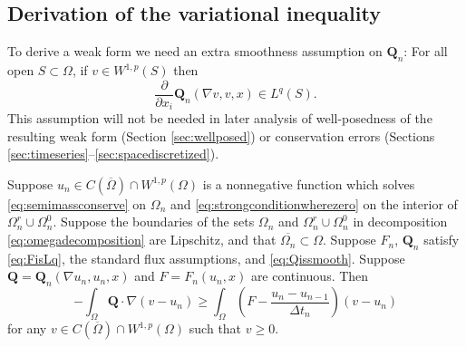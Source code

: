 \documentclass[final,onefignum]{siamart190516}
\newcommand\bQ{\mathbf{Q}}
\newcommand{\grad}{\nabla}
\begin{document}
\subsection{Derivation of the variational inequality}  \label{subsec:derivevi}  To derive a weak form we need an extra smoothness assumption on $\bQ_n$:  For all open $S \subset \Omega$, if $v\in W^{1,p}(S)$ then
\begin{equation}
\frac{\partial}{\partial x_i} \bQ_n(\grad v,v,x) \in L^q(S). \label{eq:Qissmooth}
\end{equation}
This assumption will not be needed in later analysis of well-posedness of the resulting weak form (Section \ref{sec:wellposed}) or conservation errors (Sections \ref{sec:timeseries}--\ref{sec:spacediscretized}).

\begin{theorem} \label{thm:strongimpliesweak}  Suppose $u_n \in C(\overline{\Omega}) \cap W^{1,p}(\Omega)$ is a nonnegative function which solves \eqref{eq:semimassconserve} on $\Omega_n$ and \eqref{eq:strongconditionwherezero} on the interior of $\Omega_n^r \cup \Omega_n^0$.  Suppose the boundaries of the sets $\Omega_n$ and $\Omega_n^r \cup \Omega_n^0$ in decomposition \eqref{eq:omegadecomposition} are Lipschitz, and that $\overline{\Omega_n} \subset \Omega$.  Suppose $F_n$, $\bQ_n$ satisfy \eqref{eq:FisLq}, the standard flux assumptions, and \eqref{eq:Qissmooth}.  Suppose $\bQ = \bQ_n(\grad u_n,u_n,x)$ and $F=F_n(u_n,x)$ are continuous.  Then
\begin{equation}
-\int_{\Omega} \bQ \cdot \grad(v-u_n) \ge \int_{\Omega} \left(F - \frac{u_n - u_{n-1}}{\Delta t_n}\right) (v-u_n) \label{eq:morallytheVI}
\end{equation}
for any $v \in C(\overline{\Omega}) \cap W^{1,p}(\Omega)$ such that $v \ge 0$.
\end{theorem}
\end{document}
